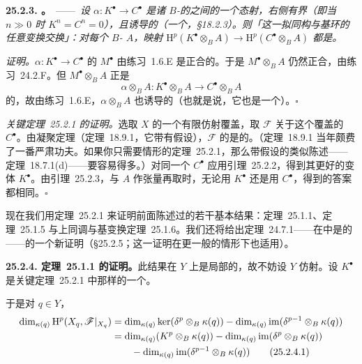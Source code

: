 \textbf{25.2.3. \trhLemma。}\ ——\ \emph{设 $\alpha\colon K^{\bullet}\to C^{\bullet}$ 是诸\textbf{\trFlat} $B$-\trModule{}的\trComplexN{}之间的一个态射，右侧有界（即当 $n\gg 0$ 时 $K^n=C^n=0$），且诱导\trCohomology{}的\trIsomorphism（一个\trQuasiisomorphism，\S18.2.3）。则「这一拟同构与基环的任意变换交换」：对每个 $B$-\trAlgebra{} $A$，映射 $\mathrm{H}^p(K^{\bullet}\otimes_B A)\to\mathrm{H}^p(C^{\bullet}\otimes_B A)$ 都是\trIsomorphism。}

\emph{证明。}\quad $\alpha\colon K^{\bullet}\to C^{\bullet}$ 的\trMappingCone{} $M^{\bullet}$ 由\mbox{练习~1.6.E} 是正合的。于是 $M^{\bullet}\otimes_B A$ 仍然正合，由\mbox{练习~24.2.F}。但 $M^{\bullet}\otimes_B A$ 正是
\[
\alpha\otimes_B A\colon K^{\bullet}\otimes_B A\longrightarrow C^{\bullet}\otimes_B A
\]
的\trMappingCone，故由\mbox{练习~1.6.E}，$\alpha\otimes_B A$ 也诱导\trCohomology{}的\trIsomorphism（也就是说，它也是一个\trQuasiisomorphism）。\hfill$\square$

\emph{\mbox{关键定理~25.2.1} 的证明。}\quad 选取 $X$ 的一个有限仿射覆盖，取 $\mathscr{F}$ 关于这个覆盖的\trCech\trComplexN{} $C^{\bullet}$。由\trGrothendieck{}凝聚定理（\mbox{定理~18.9.1}，它带有\trNoether{}假设），$\mathscr{F}$ 的\trCohomology{}是\trCoh{}的。（\mbox{定理~18.9.1} 当年颇费了一番严肃功夫。如果你只需要\trProjective{}情形的\mbox{定理~25.2.1}，那么带\trProjective{}假设的类似陈述——\mbox{定理~18.7.1}(d)——要容易得多。）对同一个\trComplexN{} $C^{\bullet}$ 应用\mbox{引理~25.2.2}，得到其更好的变体 $K^{\bullet}$。由\mbox{引理~25.2.3}，与 $A$ 作张量再取\trCohomology{}时，无论用 $K^{\bullet}$ 还是用 $C^{\bullet}$，得到的答案都相同。\hfill$\square$

现在我们用\mbox{定理~25.2.1} 来证明前面陈述过的若干基本结果：\mbox{\trSemicontinuity{}定理~25.1.1}、\mbox{\trGrauert{}定理~25.1.5} 与\mbox{上同调与基变换定理~25.1.6}。我们还将给出\mbox{定理~24.7.1}——\trEulerCharacteristic{}在\trFlat\trFamily{}中是\trLocallyConstant{}的——的一个新证明（\S25.2.5；这一证明在更一般的\trProper{}情形下也适用）。

\textbf{25.2.4. \mbox{\trSemicontinuity{}定理~25.1.1} 的证明。}\quad 此结果在 $Y$ 上是局部的，故不妨设 $Y$ 仿射。设 $K^{\bullet}$ 是\mbox{关键定理~25.2.1} 中那样的一个\trComplexN。

于是对 $q\in Y$，
\begin{align*}
\dim_{\kappa(q)}\mathrm{H}^p(X_q,\mathscr{F}|_{X_q})&=\dim_{\kappa(q)}\ker(\delta^p\otimes_B\kappa(q))-\dim_{\kappa(q)}\operatorname{im}(\delta^{p-1}\otimes_B\kappa(q))\\
&=\dim_{\kappa(q)}(K^p\otimes_B\kappa(q))-\dim_{\kappa(q)}\operatorname{im}(\delta^p\otimes_B\kappa(q))\\
&\qquad-\dim_{\kappa(q)}\operatorname{im}(\delta^{p-1}\otimes_B\kappa(q))
\tag{25.2.4.1}\label{eq:semicontinuity-dimensions}
\end{align*}

